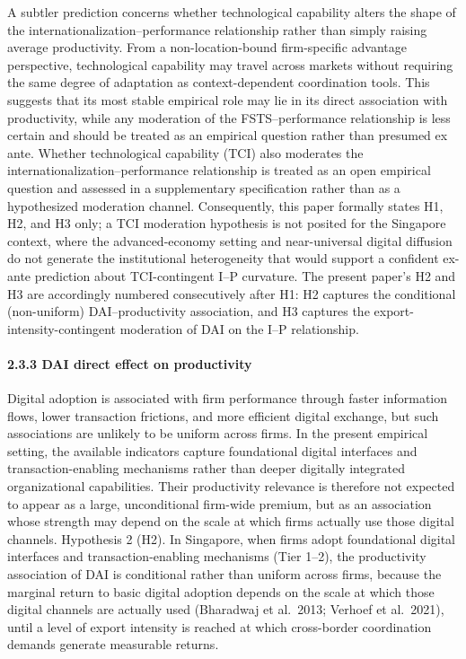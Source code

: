\documentclass[
  12pt,a4paper]{article}
\begin{document}
A subtler prediction concerns whether technological capability alters
the shape of the internationalization--performance relationship rather
than simply raising average productivity. From a non-location-bound
firm-specific advantage perspective, technological capability may travel
across markets without requiring the same degree of adaptation as
context-dependent coordination tools. This suggests that its most stable
empirical role may lie in its direct association with productivity,
while any moderation of the FSTS--performance relationship is less
certain and should be treated as an empirical question rather than
presumed ex ante. Whether technological capability (TCI) also moderates
the internationalization--performance relationship is treated as an open
empirical question and assessed in a supplementary specification rather
than as a hypothesized moderation channel. Consequently, this paper
formally states H1, H2, and H3 only; a TCI moderation hypothesis is not
posited for the Singapore context, where the advanced-economy setting
and near-universal digital diffusion do not generate the institutional
heterogeneity that would support a confident ex-ante prediction about
TCI-contingent I--P curvature. The present paper's H2 and H3 are
accordingly numbered consecutively after H1: H2 captures the conditional
(non-uniform) DAI--productivity association, and H3 captures the
export-intensity-contingent moderation of DAI on the I--P relationship.

\hypertarget{dai-direct-effect-on-productivity}{%
\paragraph{2.3.3 DAI direct effect on
productivity}\label{dai-direct-effect-on-productivity}}

Digital adoption is associated with firm performance through faster
information flows, lower transaction frictions, and more efficient
digital exchange, but such associations are unlikely to be uniform
across firms. In the present empirical setting, the available indicators
capture foundational digital interfaces and transaction-enabling
mechanisms rather than deeper digitally integrated organizational
capabilities. Their productivity relevance is therefore not expected to
appear as a large, unconditional firm-wide premium, but as an
association whose strength may depend on the scale at which firms
actually use those digital channels. Hypothesis 2 (H2). In Singapore,
when firms adopt foundational digital interfaces and
transaction-enabling mechanisms (Tier 1--2), the productivity
association of DAI is conditional rather than uniform across firms,
because the marginal return to basic digital adoption depends on the
scale at which those digital channels are actually used (Bharadwaj et
al.~2013; Verhoef et al.~2021), until a level of export intensity is
reached at which cross-border coordination demands generate measurable
returns.
\end{document}
